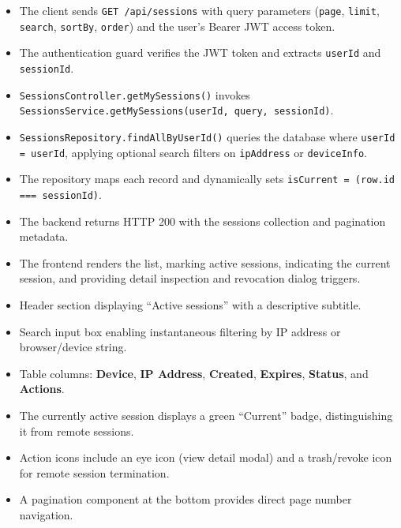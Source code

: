 \begin{itemize}[leftmargin=1.6em,topsep=3pt,itemsep=2pt,parsep=0pt,label=$\bullet$]
    \item The client sends \texttt{GET /api/sessions} with query parameters (\texttt{page}, \texttt{limit}, \texttt{search}, \texttt{sortBy}, \texttt{order}) and the user's Bearer JWT access token.
    \item The authentication guard verifies the JWT token and extracts \texttt{userId} and \texttt{sessionId}.
    \item \texttt{Sessions\allowbreak{}Controller.\allowbreak{}getMySessions()} invokes \texttt{Sessions\allowbreak{}Service.\allowbreak{}getMySessions(\allowbreak{}userId, query, sessionId)}.
    \item \texttt{Sessions\allowbreak{}Repository.\allowbreak{}find\allowbreak{}All\allowbreak{}By\allowbreak{}User\allowbreak{}Id()} queries the database where \texttt{userId = userId}, applying optional search filters on \texttt{ipAddress} or \texttt{deviceInfo}.
    \item The repository maps each record and dynamically sets \texttt{isCurrent = (\allowbreak{}row.\allowbreak{}id =\allowbreak{}=\allowbreak{}= sessionId)}.
    \item The backend returns HTTP 200 with the sessions collection and pagination metadata.
    \item The frontend renders the list, marking active sessions, indicating the current session, and providing detail inspection and revocation dialog triggers.
\end{itemize}

\begin{itemize}[leftmargin=1.6em,topsep=3pt,itemsep=2pt,parsep=0pt,label=$\bullet$]
    \item Header section displaying ``Active sessions'' with a descriptive subtitle.
    \item Search input box enabling instantaneous filtering by IP address or browser/device string.
    \item Table columns: \textbf{Device}, \textbf{IP Address}, \textbf{Created}, \textbf{Expires}, \textbf{Status}, and \textbf{Actions}.
    \item The currently active session displays a green ``Current'' badge, distinguishing it from remote sessions.
    \item Action icons include an eye icon (view detail modal) and a trash/revoke icon for remote session termination.
    \item A pagination component at the bottom provides direct page number navigation.
\end{itemize}

